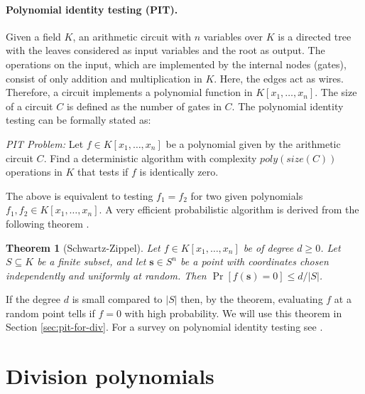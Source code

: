 \documentclass[12pt]{article}
\theoremstyle{plain}
\newtheorem{theorem}{Theorem}
\theoremstyle{definition}
\newcommand{\abs}[1]{\left\vert#1\right\vert}
\begin{document}
\paragraph{Polynomial identity testing (PIT).}
Given a field $K$, an arithmetic circuit with $n$ variables over $K$ is a directed tree with the 
leaves considered as input variables and the root as output. The operations on the input, which are 
implemented by the internal nodes (gates), consist of only addition and multiplication in $K$. 
Here, the edges act as wires. Therefore, a circuit implements a polynomial function in $K[x_1, 
\dots, x_n]$. The size of a circuit $C$ is defined as the number of gates in $C$. The polynomial 
identity testing can be formally stated as: 

\vspace*{2mm}

\textit{PIT Problem:} Let $f \in K[x_1, \dots, x_n]$ be a polynomial given by the arithmetic 
circuit $C$. Find a deterministic algorithm with complexity $poly(size(C))$ operations in $K$ that 
tests if $f$ is identically zero.

\vspace*{2mm}

The above is equivalent to testing $f_1 = f_2$ for two given polynomials $f_1, f_2 \in K[x_1, 
\dots, x_n]$. A very efficient probabilistic algorithm is derived from the following theorem 
\cite{schwartz1980,zippel1979}.
\begin{theorem}[Schwartz-Zippel]
	Let $f \in K[x_1, \dots, x_n]$ be of degree $d \ge 0$. Let $S \subseteq K$ be a finite subset, 
	and let $\mathbf{s} \in S^n$ be a point with coordinates chosen independently and uniformly at 
	random. Then $\Pr[f(\mathbf{s}) = 0] \le d / \abs{S}$.
\end{theorem}
If the degree $d$ is small compared to $\abs{S}$ then, by the theorem, evaluating $f$ at a random 
point tells if $f = 0$ with high probability. We will use this theorem in Section 
\ref{sec:pit-for-div}. For a survey on polynomial identity testing see \cite{saxena2009}.






\section{Division polynomials}
\label{sec:divpoly}
\end{document}
